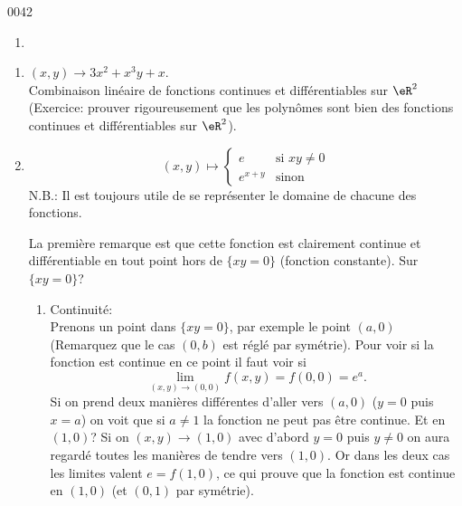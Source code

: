 \begin{corrige}{0042}
\begin{alternative}
\begin{enumerate}
\item

\end{enumerate}
\end{alternative}


\begin{alternative}
	
\begin{enumerate}
\item $(x,y)\rightarrow  3x^2+x^3y+x$.\\
Combinaison linéaire de fonctions continues et différentiables sur $\eR^2$ (Exercice: prouver rigoureusement que les polyn\^{o}mes sont bien des fonctions continues et différentiables sur $\eR^2$).

\item
    \begin{equation}
        (x,y)\mapsto \begin{cases}
            e    &   \text{si } xy\neq0\\
            e^{x+y}    &    \text{sinon}
        \end{cases}
    \end{equation}
N.B.: Il est toujours utile de se représenter le domaine de chacune des fonctions. 

\noindent La première remarque est que cette fonction est clairement continue et différentiable en tout point hors de $\{xy=0\}$ (fonction constante). Sur $\{xy=0\}$?
\begin{enumerate}
\item Continuité:\\
Prenons un point dans $\{xy=0\}$, par exemple le point $(a,0)$ (Remarquez que le cas $(0,b)$ est réglé par symétrie). Pour voir si la fonction est continue en ce point il faut voir si \[\lim_{(x,y)\rightarrow (0,0)}f(x,y)=f(0,0)=e^a.\] Si on prend deux manières différentes d'aller vers $(a,0)$ ($y=0$ puis $x=a$) on voit que si $a \neq1$ la fonction ne peut pas être continue. Et en $(1,0)$? Si on $(x,y)\rightarrow (1,0)$ avec d'abord $y=0$ puis $y\neq0$ on aura regardé toutes les manières de tendre vers $(1,0)$. Or dans les deux cas les limites valent $e = f(1,0)$, ce qui prouve que la fonction est continue en $(1,0)$ (et $(0,1)$ par symétrie).


\end{enumerate}
\end{enumerate}
\end{alternative}
\end{corrige}
